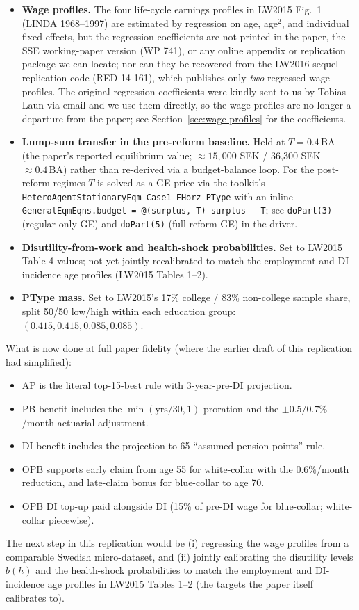 \begin{itemize}
\item \textbf{Wage profiles.} The four life-cycle earnings profiles in LW2015 Fig.~1 (LINDA 1968--1997) are estimated by regression on age, age$^2$, and individual fixed effects, but the regression coefficients are not printed in the paper, the SSE working-paper version (WP 741), or any online appendix or replication package we can locate; nor can they be recovered from the LW2016 sequel replication code (RED 14-161), which publishes only \emph{two} regressed wage profiles. The original regression coefficients were kindly sent to us by Tobias Laun via email and we use them directly, so the wage profiles are no longer a departure from the paper; see Section~\ref{sec:wage-profiles} for the coefficients.
\item \textbf{Lump-sum transfer in the pre-reform baseline.} Held at $T = 0.4\,\text{BA}$ (the paper's reported equilibrium value; $\approx 15{,}000$ SEK / 36{,}300 SEK $\approx 0.4\,\text{BA}$) rather than re-derived via a budget-balance loop. For the post-reform regimes $T$ is solved as a GE price via the toolkit's \texttt{HeteroAgentStationaryEqm\_Case1\_FHorz\_PType} with an inline \texttt{GeneralEqmEqns.budget = @(surplus, T) surplus - T}; see \texttt{doPart(3)} (regular-only GE) and \texttt{doPart(5)} (full reform GE) in the driver.
\item \textbf{Disutility-from-work and health-shock probabilities.} Set to LW2015 Table 4 values; not yet jointly recalibrated to match the employment and DI-incidence age profiles (LW2015 Tables 1--2).
\item \textbf{PType mass.} Set to LW2015's 17\% college / 83\% non-college sample share, split 50/50 low/high within each education group: $(0.415, 0.415, 0.085, 0.085)$.
\end{itemize}

What is now done at full paper fidelity (where the earlier draft of this replication had simplified):
\begin{itemize}
\item AP is the literal top-15-best rule with 3-year-pre-DI projection.
\item PB benefit includes the $\min(\text{yrs}/30,1)$ proration and the $\pm 0.5/0.7\%$/month actuarial adjustment.
\item DI benefit includes the projection-to-65 ``assumed pension points'' rule.
\item OPB supports early claim from age 55 for white-collar with the 0.6\%/month reduction, and late-claim bonus for blue-collar to age 70.
\item OPB DI top-up paid alongside DI (15\% of pre-DI wage for blue-collar; white-collar piecewise).
\end{itemize}

The next step in this replication would be (i) regressing the wage profiles from a comparable Swedish micro-dataset, and (ii) jointly calibrating the disutility levels $b(h)$ and the health-shock probabilities to match the employment and DI-incidence age profiles in LW2015 Tables 1--2 (the targets the paper itself calibrates to).
